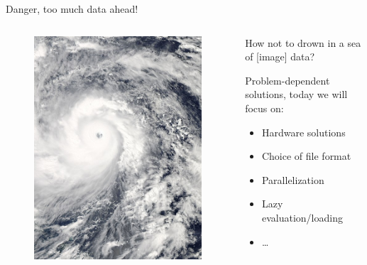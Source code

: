 \documentclass[9pt, aspectratio=169]{beamer}
\begin{document}
\begin{frame}
	{Danger, too much data ahead!}
	\begin{columns}
		\begin{column}{.5\textwidth}
			\begin{figure}
				\centering
				\includegraphics[width=.7\textwidth]{storm.jpg}
				\caption{\color{gray}{Souce: NASA, Public Domain}}
			\end{figure}
		\end{column}
		\begin{column}{.5\textwidth}
			\large
			How not to drown in a sea of [image] data?

			\vspace{1em}

			\normalsize
			Problem-dependent solutions, today we will focus on:

			\begin{itemize}
				\item Hardware solutions
				\item Choice of file format
				\item Parallelization
				\item Lazy evaluation/loading
				\item \dots
			\end{itemize}
		\end{column}
	\end{columns}
\end{frame}
\end{document}
